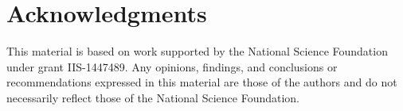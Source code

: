 \section{Acknowledgments}
\label{sec:acknowledgements}
This material is based on work supported by the National Science Foundation under grant IIS-1447489.
Any opinions, findings, and conclusions or recommendations expressed in this material are those of the authors and do not necessarily reflect those of the National Science Foundation.
